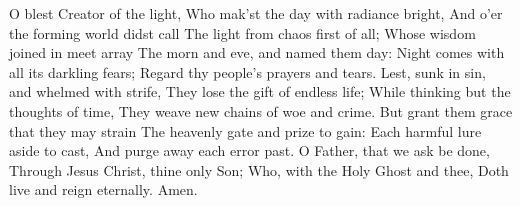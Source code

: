 
O blest Creator of the light,
Who mak’st the day with radiance bright,
And o’er the forming world didst call
The light from chaos first of all;
\vskip 1mm
Whose wisdom joined in meet array
The morn and eve, and named them day:
Night comes with all its darkling fears;
Regard thy people’s prayers and tears.
\vskip 1mm
Lest, sunk in sin, and whelmed with strife,
They lose the gift of endless life;
While thinking but the thoughts of time,
They weave new chains of woe and crime.
\vskip 1mm
But grant them grace that they may strain
The heavenly gate and prize to gain:
Each harmful lure aside to cast,
And purge away each error past.
\vskip 1mm
O Father, that we ask be done,
Through Jesus Christ, thine only Son;
Who, with the Holy Ghost and thee,
Doth live and reign eternally.
Amen.